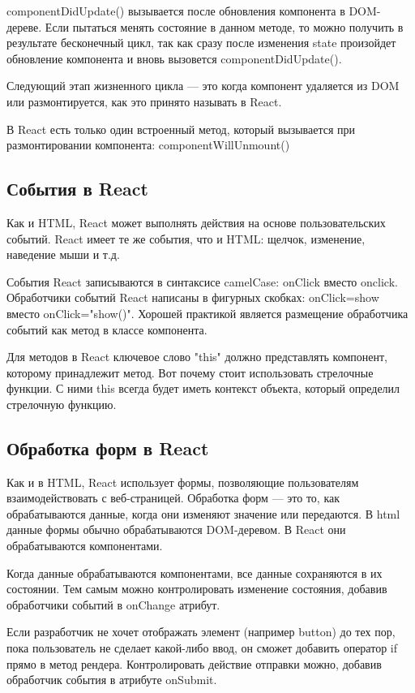 \documentclass[a4paper,12pt]{diplom}
\begin{document}
componentDidUpdate() вызывается после обновления компонента в DOM-дереве. Если пытаться менять состояние в данном методе, то можно получить в результате бесконечный цикл, так как сразу после изменения state произойдет обновление компонента и вновь вызовется componentDidUpdate().

Следующий этап жизненного цикла — это когда компонент удаляется из DOM или размонтируется, как это принято называть в React.

В React есть только один встроенный метод, который вызывается при размонтировании компонента: componentWillUnmount()

\subsection{События в React}

Как и HTML, React может выполнять действия на основе пользовательских событий.
React имеет те же события, что и HTML: щелчок, изменение, наведение мыши и т.д.

События React записываются в синтаксисе camelCase:
onClick вместо onclick.
Обработчики событий React написаны в фигурных скобках:
onClick={show} вместо onClick="show()".
Хорошей практикой является размещение обработчика событий как метод в классе компонента.

Для методов в React ключевое слово "this" должно представлять компонент, которому принадлежит метод.
Вот почему стоит использовать стрелочные функции. С ними this всегда будет иметь контекст объекта, который определил стрелочную функцию.

\subsection{Обработка форм в React}

Как и в HTML, React использует формы, позволяющие пользователям взаимодействовать с веб-страницей.
Обработка форм — это то, как обрабатываются данные, когда они изменяют значение или передаются.
В html данные формы обычно обрабатываются DOM-деревом. В React они обрабатываются компонентами.

Когда данные обрабатываются компонентами, все данные сохраняются в их состоянии.
Тем самым можно контролировать изменение состояния, добавив обработчики событий в onChange атрибут.

Если разработчик не хочет отображать элемент (например button) до тех пор, пока пользователь не сделает какой-либо ввод, он сможет добавить оператор if прямо в метод рендера.
Контролировать действие отправки можно, добавив обработчик события в атрибуте onSubmit.
\end{document}

